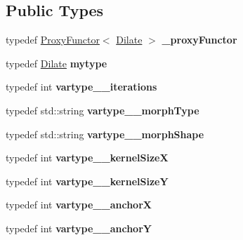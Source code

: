 \subsection*{Public Types}
\begin{DoxyCompactItemize}
\item 
\mbox{\label{classfilter_1_1algos_1_1_dilate_af05fbd11aac2914a073e123f6a6a06d0}} 
typedef \hyperlink{class_proxy_functor}{Proxy\+Functor}$<$ \hyperlink{classfilter_1_1algos_1_1_dilate}{Dilate} $>$ {\bfseries \+\_\+proxy\+Functor}
\item 
\mbox{\label{classfilter_1_1algos_1_1_dilate_a115326e512d434599bf888c9c22691a2}} 
typedef \hyperlink{classfilter_1_1algos_1_1_dilate}{Dilate} {\bfseries mytype}
\item 
\mbox{\label{classfilter_1_1algos_1_1_dilate_af5c6fbbaddce7209a735bfaa9945fa03}} 
typedef int {\bfseries vartype\+\_\+\+\_\+iterations}
\item 
\mbox{\label{classfilter_1_1algos_1_1_dilate_a9258cacda0e613d4af72945ee2662226}} 
typedef std\+::string {\bfseries vartype\+\_\+\+\_\+morph\+Type}
\item 
\mbox{\label{classfilter_1_1algos_1_1_dilate_ae385a0384b35ddc0606fe4a9dfc2327a}} 
typedef std\+::string {\bfseries vartype\+\_\+\+\_\+morph\+Shape}
\item 
\mbox{\label{classfilter_1_1algos_1_1_dilate_a6715cde74d38cb990188c092ffd981cf}} 
typedef int {\bfseries vartype\+\_\+\+\_\+kernel\+SizeX}
\item 
\mbox{\label{classfilter_1_1algos_1_1_dilate_ad1abfbcfd400fcf28bee4e4a083c6a4c}} 
typedef int {\bfseries vartype\+\_\+\+\_\+kernel\+SizeY}
\item 
\mbox{\label{classfilter_1_1algos_1_1_dilate_afecc3fa88157ebc3e66e610590397461}} 
typedef int {\bfseries vartype\+\_\+\+\_\+anchorX}
\item 
\mbox{\label{classfilter_1_1algos_1_1_dilate_adde43e4c66e7f89982d9a050bf8760d2}} 
typedef int {\bfseries vartype\+\_\+\+\_\+anchorY}
\end{DoxyCompactItemize}
